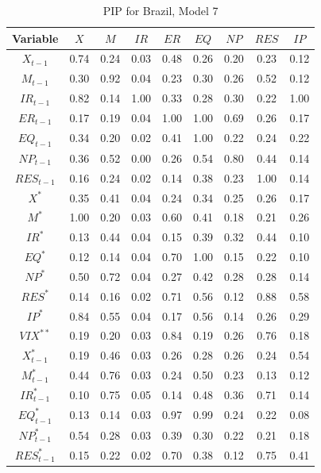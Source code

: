 \documentclass[a4paper, twoside]{templates/ociamthesis}
\begin{document}
\clearpage

\begin{table}[!ht]

\caption{\label{tab:TablePIPBR7}PIP for Brazil, Model 7}
\centering
\fontsize{7}{9}\selectfont
\begin{tabular}[t]{ccccccccc}
\toprule
Variable & $X$ & $M$ & $IR$ & $ER$ & $EQ$ & $NP$ & $RES$ & $IP$\\
\midrule
$X_{t-1}$ & 0.74 & 0.24 & 0.03 & 0.48 & 0.26 & 0.20 & 0.23 & 0.12\\
$M_{t-1}$ & 0.30 & 0.92 & 0.04 & 0.23 & 0.30 & 0.26 & 0.52 & 0.12\\
$IR_{t-1}$ & 0.82 & 0.14 & 1.00 & 0.33 & 0.28 & 0.30 & 0.22 & 1.00\\
$ER_{t-1}$ & 0.17 & 0.19 & 0.04 & 1.00 & 1.00 & 0.69 & 0.26 & 0.17\\
$EQ_{t-1}$ & 0.34 & 0.20 & 0.02 & 0.41 & 1.00 & 0.22 & 0.24 & 0.22\\
$NP_{t-1}$ & 0.36 & 0.52 & 0.00 & 0.26 & 0.54 & 0.80 & 0.44 & 0.14\\
$RES_{t-1}$ & 0.16 & 0.24 & 0.02 & 0.14 & 0.38 & 0.23 & 1.00 & 0.14\\
$X^*$ & 0.35 & 0.41 & 0.04 & 0.24 & 0.34 & 0.25 & 0.26 & 0.17\\
$M^*$ & 1.00 & 0.20 & 0.03 & 0.60 & 0.41 & 0.18 & 0.21 & 0.26\\
$IR^*$ & 0.13 & 0.44 & 0.04 & 0.15 & 0.39 & 0.32 & 0.44 & 0.10\\
$EQ^*$ & 0.12 & 0.14 & 0.04 & 0.70 & 1.00 & 0.15 & 0.22 & 0.10\\
$NP^*$ & 0.50 & 0.72 & 0.04 & 0.27 & 0.42 & 0.28 & 0.28 & 0.14\\
$RES^*$ & 0.14 & 0.16 & 0.02 & 0.71 & 0.56 & 0.12 & 0.88 & 0.58\\
$IP^*$ & 0.84 & 0.55 & 0.04 & 0.17 & 0.56 & 0.14 & 0.26 & 0.29\\
$VIX^{**}$ & 0.19 & 0.20 & 0.03 & 0.84 & 0.19 & 0.26 & 0.76 & 0.18\\
$X^*_{t-1}$ & 0.19 & 0.46 & 0.03 & 0.26 & 0.28 & 0.26 & 0.24 & 0.54\\
$M^*_{t-1}$ & 0.44 & 0.76 & 0.03 & 0.24 & 0.50 & 0.23 & 0.13 & 0.12\\
$IR^*_{t-1}$ & 0.10 & 0.75 & 0.05 & 0.14 & 0.48 & 0.36 & 0.71 & 0.14\\
$EQ^*_{t-1}$ & 0.13 & 0.14 & 0.03 & 0.97 & 0.99 & 0.24 & 0.22 & 0.08\\
$NP^*_{t-1}$ & 0.54 & 0.28 & 0.03 & 0.39 & 0.30 & 0.22 & 0.21 & 0.18\\
$RES^*_{t-1}$ & 0.15 & 0.22 & 0.02 & 0.70 & 0.38 & 0.12 & 0.75 & 0.41\\

\end{tabular}
\end{table}
\end{document}
